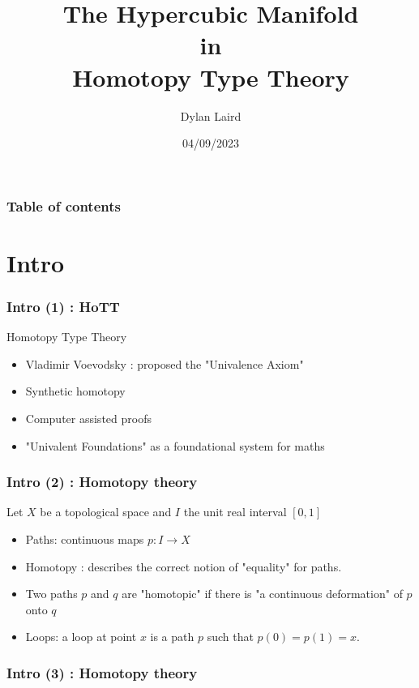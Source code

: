 \documentclass{beamer}
\title{
    The Hypercubic Manifold\\
    in\\
    Homotopy Type Theory}
\date{04/09/2023}
\author{Dylan Laird}
\begin{document}
\frame{\titlepage}

\begin{frame}
    \frametitle{Table of contents}
    \tableofcontents
\end{frame}
\section{Intro}
\begin{frame}
    \frametitle{Intro (1) : HoTT }
    \begin{exampleblock}{Homotopy Type Theory}
        \begin{itemize}
            \item Vladimir Voevodsky : proposed the "Univalence Axiom"
            \pause
            \item Synthetic homotopy
            \pause
            \item Computer assisted proofs
            \pause
            \item "Univalent Foundations" as a foundational system for maths
        \end{itemize}
    \end{exampleblock}
\end{frame}
\begin{frame}
    \frametitle{Intro (2) : Homotopy theory}
    Let $X$ be a topological space and $I$ the unit real interval $[0,1]$
    \pause
    \begin{itemize}
        \item Paths:  continuous maps $p : I \rightarrow X$
        \pause
        \item Homotopy : describes the correct notion of "equality" for paths. \\
        \pause
        \item Two paths $p$ and $q$ are "homotopic" if there is "a continuous deformation" of $p$ onto $q$
        \pause
        \item Loops: a loop at point $x$ is a path $p$ such that $p(0)=p(1)=x$.
    \end{itemize}
\end{frame}
\begin{frame}
    \frametitle{Intro (3) : Homotopy theory}
    \begin{figure}[h]
        \centering
    \end{figure}
\end{frame}
\end{document}
